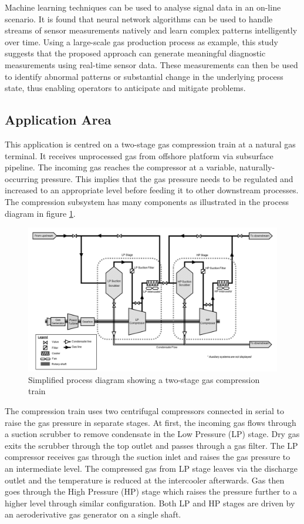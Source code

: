 \documentclass[11pt]{article} %
\theoremstyle{plain}
\theoremstyle{definition}
\begin{document}
Machine learning techniques can be used to analyse signal data in an on-line scenario. It is found that neural network algorithms can be used to handle streams of sensor measurements natively and learn complex patterns intelligently over time. Using a large-scale gas production process as example, this study suggests that the proposed approach can generate meaningful diagnostic measurements using real-time sensor data. These measurements can then be used to identify abnormal patterns or substantial change in the underlying process state, thus enabling operators to anticipate and mitigate problems.

\subsection{Application Area}

This application is centred on a two-stage gas compression train at a natural gas terminal. It receives unprocessed gas from offshore platform via subsurface pipeline. The incoming gas reaches the compressor at a variable, naturally-occurring pressure. This implies that the gas pressure needs to be regulated and increased to an appropriate level before feeding it to other downstream processes. The compression subsystem has many components as illustrated in the process diagram in figure \ref{fig:process_diagram}.

\begin{figure}[h]
	\centering
	\includegraphics[width=1\textwidth]{process_diagram.PNG}
	\caption{Simplified process diagram showing a two-stage gas compression train}
	\label{fig:process_diagram}
\end{figure}

The compression train uses two centrifugal compressors connected in serial to raise the gas pressure in separate stages. At first, the incoming gas flows through a suction scrubber to remove condensate in the Low Pressure (LP) stage. Dry gas exits the scrubber through the top outlet and passes through a gas filter. The LP compressor receives gas through the suction inlet and raises the gas pressure to an intermediate level. The compressed gas from LP stage leaves via the discharge outlet and the temperature is reduced at the intercooler afterwards. Gas then goes through the High Pressure (HP) stage which raises the pressure further to a higher level through similar configuration. Both LP and HP stages are driven by an aeroderivative gas generator on a single shaft.
\end{document}
